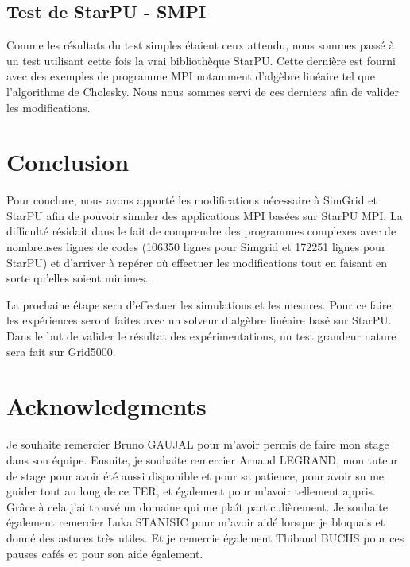 \documentclass[smallextended]{svjour3}
\begin{document}
\subsection{Test de StarPU - SMPI}
\label{sec-6-2}
Comme les résultats du test simples étaient ceux attendu, nous
sommes passé à un test utilisant cette fois la vrai bibliothèque
StarPU. Cette dernière est fourni avec des exemples de programme MPI
notamment d'algèbre linéaire tel que l'algorithme de Cholesky. Nous
nous sommes servi de ces derniers afin de valider les
modifications. 
\section{Conclusion}
\label{sec-7}
Pour conclure, nous avons apporté les modifications nécessaire à 
SimGrid et StarPU afin de pouvoir simuler des applications MPI basées 
sur StarPU MPI. La difficulté résidait dans le fait de comprendre des 
programmes complexes avec de nombreuses lignes de codes (106350 lignes 
pour Simgrid et 172251 lignes pour StarPU) et d'arriver à repérer où 
effectuer les modifications tout en faisant en sorte qu'elles soient 
minimes.

La prochaine étape sera d'effectuer les simulations et les mesures. 
Pour ce faire les expériences seront faites avec un solveur d'algèbre 
linéaire basé sur StarPU. Dans le but de valider le résultat des 
expérimentations, un test grandeur nature sera fait sur Grid5000.  

\section*{Acknowledgments}
Je souhaite remercier Bruno GAUJAL pour m'avoir permis de faire mon
stage dans son équipe. Ensuite, je souhaite  remercier
Arnaud LEGRAND, mon tuteur de stage pour avoir été
aussi disponible et pour sa patience, pour avoir su me guider tout
au long de ce TER, et également pour m'avoir tellement appris. Grâce
à cela j'ai trouvé un domaine qui me plaît particulièrement. Je souhaite
également remercier Luka STANISIC pour m'avoir aidé lorsque je
bloquais et donné des astuces très utiles. Et je remercie également
Thibaud BUCHS pour ces pauses cafés et pour son aide également. 
\nocite{*}
\def\raggedright{}


\end{document}
